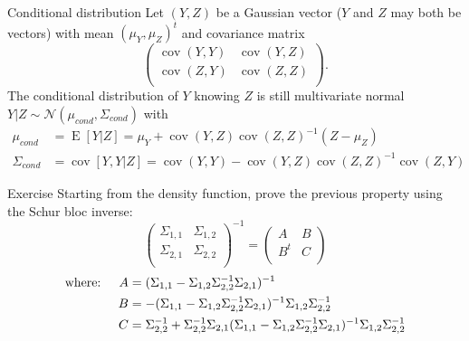 \documentclass{beamer}
\DeclareMathOperator*{\E}{E}
\DeclareMathOperator*{\Cov}{cov}
\begin{document}
\begin{frame}{}
\begin{block}{Conditional distribution}
Let $(Y,Z)$ be a Gaussian vector ($Y$ and $Z$ may both be vectors) with mean $(\mu_Y,\mu_Z)^t$ and covariance matrix
\begin{equation*}
\begin{pmatrix}
	\Cov(Y,Y) & \Cov(Y,Z)\\
	\Cov(Z,Y) & \Cov(Z,Z)\\
\end{pmatrix}.
\end{equation*}
The conditional distribution of $Y$ knowing $Z$ is still multivariate normal $Y|Z \sim \mathcal{N}(\mu_{cond},\Sigma_{cond})$ with
\begin{equation*}
\begin{split}
	\mu_{cond} &= \E [Y|Z] = \mu_Y + \Cov(Y,Z) \Cov(Z,Z)^{-1} (Z-\mu_Z)\\ 
	\Sigma_{cond} &= \Cov [Y,Y|Z] = \Cov(Y,Y) - \Cov(Y,Z) \Cov(Z,Z)^{-1} \Cov(Z,Y)
\end{split}
\end{equation*}
\end{block}
\end{frame}

\begin{frame}{}
\begin{exampleblock}{Exercise}
	Starting from the density function, prove the previous property using the Schur bloc inverse:
\begin{equation*}
\begin{pmatrix}
	\Sigma_{1,1} & \Sigma_{1,2}\\
	\Sigma_{2,1} & \Sigma_{2,2}\\
\end{pmatrix}^{-1} = 
\begin{pmatrix}
	A & B\\
	B^t & C\\
\end{pmatrix}
\end{equation*}
\begin{equation*}
\begin{split}
 \text{where: \quad} A &= (\Sigma_{1,1} - \Sigma_{1,2} \Sigma_{2,2}^{-1} \Sigma_{2,1})^{-1}\\
 B &= -(\Sigma_{1,1} - \Sigma_{1,2} \Sigma_{2,2}^{-1} \Sigma_{2,1})^{-1}\Sigma_{1,2}\Sigma_{2,2}^{-1}\\
 C &= \Sigma_{2,2}^{-1} + \Sigma_{2,2}^{-1} \Sigma_{2,1} (\Sigma_{1,1} -\Sigma_{1,2} \Sigma_{2,2}^{-1} \Sigma_{2,1})^{-1}\Sigma_{1,2}\Sigma_{2,2}^{-1}
\end{split}
\end{equation*}
\end{exampleblock}
\end{frame}
\end{document}
